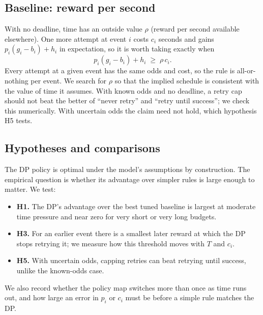 \documentclass[11pt,a4paper]{article}
\begin{document}
\subsection{Baseline: reward per second}
\label{sec:baseline}
With no deadline, time has an outside value \(\rho\) (reward per second available elsewhere). One more attempt at event \(i\) costs \(c_i\) seconds and gains \(p_i(g_i-b_i)+h_i\) in expectation, so it is worth taking exactly when
\begin{equation}
p_i(g_i - b_i) + h_i \;\ge\; \rho\, c_i.
\label{eq:rho}
\end{equation}
Every attempt at a given event has the same odds and cost, so the rule is all-or-nothing per event. We search for \(\rho\) so that the implied schedule is consistent with the value of time it assumes. With known odds and no deadline, a retry cap should not beat the better of ``never retry'' and ``retry until success''; we check this numerically. With uncertain odds the claim need not hold, which hypothesis H5 tests.

\subsection{Hypotheses and comparisons}
The DP policy is optimal under the model's assumptions by construction. The empirical question is whether its advantage over simpler rules is large enough to matter. We test:
\begin{itemize}
\item \textbf{H1.} The DP's advantage over the best tuned baseline is largest at moderate time pressure and near zero for very short or very long budgets.
\item \textbf{H3.} For an earlier event there is a smallest later reward at which the DP stops retrying it; we measure how this threshold moves with \(T\) and \(c_i\).
\item \textbf{H5.} With uncertain odds, capping retries can beat retrying until success, unlike the known-odds case.
\end{itemize}
We also record whether the policy map switches more than once as time runs out, and how large an error in \(p_i\) or \(c_i\) must be before a simple rule matches the DP.
\end{document}
